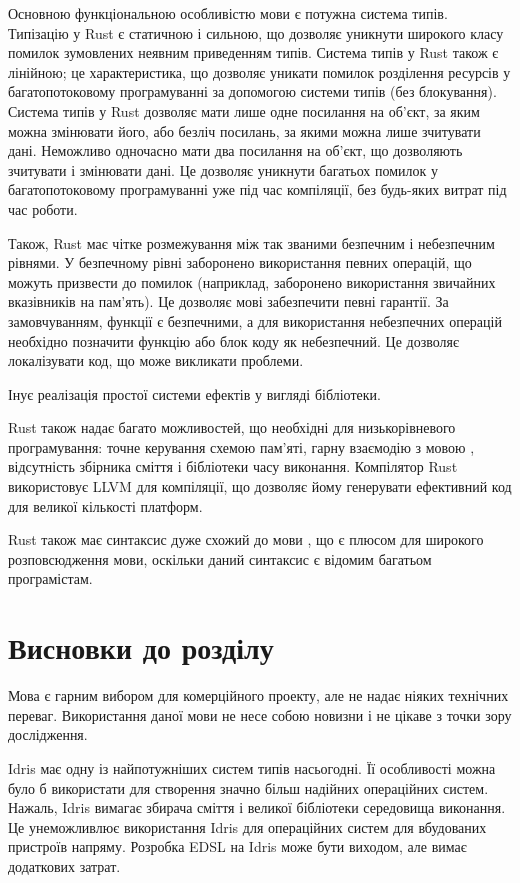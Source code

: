 \documentclass[oneside,14pt,a4paper,final]{myextreport}
\newcommand{\specialsection}[1]{\section*{#1}\addcontentsline{toc}{section}{#1}}
\newcommand{\chapterconslusions}{
  \specialsection{Висновки до розділу \thechapter}
}
\begin{document}
Основною функціональною особливістю мови є потужна система типів. Типізацію у Rust є статичною і сильною, що дозволяє уникнути широкого класу помилок зумовлених неявним приведенням типів. Система типів у Rust також є лінійною; це характеристика, що дозволяє уникати помилок розділення ресурсів у багатопотоковому програмуванні за допомогою системи типів (без блокування). Система типів у Rust дозволяє мати лише одне посилання на об'єкт, за яким можна змінювати його, або безліч посилань, за якими можна лише зчитувати дані. Неможливо одночасно мати два посилання на об'єкт, що дозволяють зчитувати і змінювати дані. Це дозволяє уникнути багатьох помилок у багатопотоковому програмуванні уже під час компіляції, без будь-яких витрат під час роботи.

Також, Rust має чітке розмежування між так званими безпечним і небезпечним рівнями. У безпечному рівні заборонено використання певних операцій, що можуть призвести до помилок (наприклад, заборонено використання звичайних вказівників на пам'ять). Це дозволяє мові забезпечити певні гарантії. За замовчуванням, функції є безпечними, а для використання небезпечних операцій необхідно позначити функцію або блок коду як небезпечний. Це дозволяє локалізувати код, що може викликати проблеми.

Інує реалізація простої системи ефектів у вигляді бібліотеки.

Rust також надає багато можливостей, що необхідні для низькорівневого програмування: точне керування схемою пам'яті, гарну взаємодію з мовою \LangC{}, відсутність збірника сміття і бібліотеки часу виконання. Компілятор Rust використовує LLVM\cite{llvm} для компіляції, що дозволяє йому генерувати ефективний код для великої кількості платформ.

Rust також має синтаксис дуже схожий до мови \LangC{}, що є плюсом для широкого розповсюдження мови, оскільки даний синтаксис є відомим багатьом програмістам.

\chapterconslusions{}

Мова \LangC{} є гарним вибором для комерційного проекту, але не надає ніяких технічних переваг. Використання даної мови не несе собою новизни і не цікаве з точки зору дослідження.

Idris має одну із найпотужніших систем типів насьогодні. Її особливості можна було б використати для створення значно більш надійних операційних систем. Нажаль, Idris вимагає збирача сміття і великої бібліотеки середовища виконання. Це унеможливлює використання Idris для операційних систем для вбудованих пристроїв напряму. Розробка EDSL на Idris може бути виходом, але вимає додаткових затрат.
\end{document}
